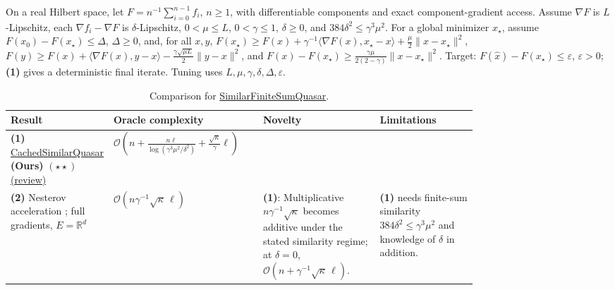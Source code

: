 \begin{table}[tp]
\centering
\caption{Comparison for \href{https://github.com/k3nfalt/longtails/blob/main/LongTails/Setups/SimilarFiniteSumQuasar.lean}{SimilarFiniteSumQuasar}.}\label{tab:SimilarFiniteSumQuasar}
\parbox{\linewidth}{\footnotesize On a real Hilbert space, let $F=n^{-1}\sum_{i=0}^{n-1}f_i$, $n\ge1$, with differentiable components and exact component-gradient access. Assume $\nabla F$ is $L$-Lipschitz, each $\nabla f_i-\nabla F$ is $\delta$-Lipschitz, $0<\mu\le L$, $0<\gamma\le1$, $\delta\ge0$, and $384\delta^2\le\gamma^3\mu^2$. For a global minimizer $x_\star$, assume $F(x_0)-F(x_\star)\le\Delta$, $\Delta\ge0$, and, for all $x,y$, $F(x_\star)\ge F(x)+\gamma^{-1}\langle\nabla F(x),x_\star-x\rangle+\frac{\mu}{2}\|x-x_\star\|^2$, $F(y)\ge F(x)+\langle\nabla F(x),y-x\rangle-\frac{\gamma\sqrt{\mu L}}{2}\|y-x\|^2$, and $F(x)-F(x_\star)\ge\frac{\gamma\mu}{2(2-\gamma)}\|x-x_\star\|^2$. Target: $F(\widehat x)-F(x_\star)\le\varepsilon$, $\varepsilon>0$; \textbf{(1)} gives a deterministic final iterate. Tuning uses $L,\mu,\gamma,\delta,\Delta,\varepsilon$.}\par\smallskip
\begin{threeparttable}
\footnotesize
\setlength{\tabcolsep}{4pt}\renewcommand{\arraystretch}{1.25}
\begin{tabularx}{\linewidth}{@{}>{\raggedright\arraybackslash}p{0.20\linewidth}>{\raggedright\arraybackslash}p{0.32\linewidth}>{\raggedright\arraybackslash}p{0.25\linewidth}>{\raggedright\arraybackslash}X@{}}
\toprule
\textbf{Result} & \textbf{Oracle complexity} & \textbf{Novelty} & \textbf{Limitations} \\
\midrule
\textbf{(1)} \href{https://github.com/k3nfalt/longtails/blob/main/LongTails/Theorems/CachedSimilarQuasar.lean}{Cached\allowbreak Similar\allowbreak Quasar} \textbf{(Ours)} $(\star\star)$ \href{https://github.com/k3nfalt/longtails/blob/main/scripts/reviews/CachedSimilarQuasar.md}{(review)}
& $\displaystyle\mathcal{O}\!\left(n+\frac{n\ell}{\log(\gamma^3\mu^2/\delta^2)}+\frac{\sqrt\kappa}{\gamma}\ell\right)$ & & \\
\midrule[1.2pt]
\textbf{(2)} Nesterov acceleration \citep[Thm.~2, v3]{sfqHermant2026v3}; full gradients, $E=\mathbb R^d$
& $\mathcal{O}\!\left(n\gamma^{-1}\sqrt\kappa\,\ell\right)$
& \textbf{(1)}: Multiplicative $n\gamma^{-1}\sqrt\kappa$ becomes additive under the stated similarity regime; at $\delta=0$, $\mathcal{O}(n+\gamma^{-1}\sqrt\kappa\,\ell)$.
& \textbf{(1)} needs finite-sum similarity $384\delta^2\le\gamma^3\mu^2$ and knowledge of $\delta$ in addition. \\

\end{tabularx}
\end{threeparttable}
\end{table}
